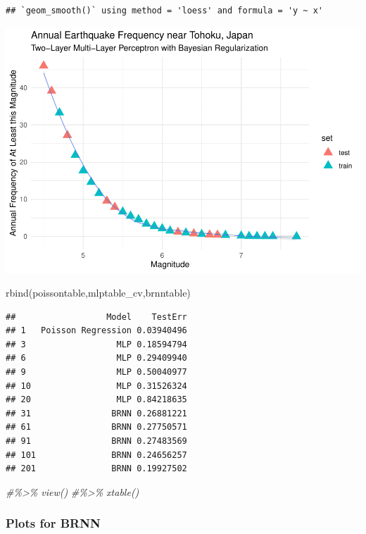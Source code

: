 \documentclass[
]{article}
\newenvironment{Shaded}{\begin{snugshade}}{\end{snugshade}}
\newcommand{\CommentTok}[1]{\textcolor[rgb]{0.56,0.35,0.01}{\textit{#1}}}
\newcommand{\FunctionTok}[1]{\textcolor[rgb]{0.00,0.00,0.00}{#1}}
\newcommand{\NormalTok}[1]{#1}
\begin{document}
\begin{verbatim}
## `geom_smooth()` using method = 'loess' and formula = 'y ~ x'
\end{verbatim}

\includegraphics{Appendix_eq_files/figure-latex/unnamed-chunk-11-1.pdf}

\begin{Shaded}
\begin{Highlighting}[]
\FunctionTok{rbind}\NormalTok{(poissontable,mlptable\_cv,brnntable)}
\end{Highlighting}
\end{Shaded}

\begin{verbatim}
##                  Model    TestErr
## 1   Poisson Regression 0.03940496
## 3                  MLP 0.18594794
## 6                  MLP 0.29409940
## 9                  MLP 0.50040977
## 10                 MLP 0.31526324
## 20                 MLP 0.84218635
## 31                BRNN 0.26881221
## 61                BRNN 0.27750571
## 91                BRNN 0.27483569
## 101               BRNN 0.24656257
## 201               BRNN 0.19927502
\end{verbatim}

\begin{Shaded}
\begin{Highlighting}[]
\CommentTok{\#\%\textgreater{}\% view()}
\CommentTok{\#\%\textgreater{}\% xtable()}
\end{Highlighting}
\end{Shaded}

\hypertarget{plots-for-brnn}{%
\subsubsection{Plots for BRNN}\label{plots-for-brnn}}
\end{document}
